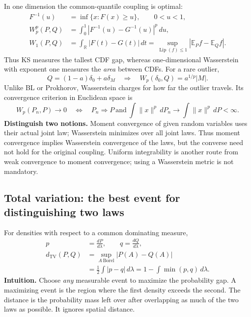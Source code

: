 \documentclass[12pt]{article}
\newcommand{\E}{\mathbb E}
\newcommand{\R}{\mathbb R}
\DeclareMathOperator{\Lip}{Lip}
\begin{document}
In one dimension the common-quantile coupling is optimal:
\begin{align}
 F^{-1}(u)&=\inf\{x:F(x)\ge u\},\qquad 0<u<1,\\
 W_p^p(P,Q)&=\int_0^1|F^{-1}(u)-G^{-1}(u)|^p\,du,\\
 W_1(P,Q)&=\int_{\R}|F(t)-G(t)|\,dt
 =\sup_{\Lip(f)\le1}|\E_Pf-\E_Qf|.
\end{align}
Thus KS measures the tallest CDF gap, whereas one-dimensional Wasserstein
with exponent one measures the \emph{area} between CDFs. For a rare outlier,
\begin{equation}
 Q=(1-a)\delta_0+a\delta_M
 \quad\Longrightarrow\quad W_p(\delta_0,Q)=a^{1/p}|M|.
\end{equation}
Unlike BL or Prokhorov, Wasserstein charges for how far the outlier travels.
Its convergence criterion in Euclidean space is
\begin{equation}
 W_p(P_n,P)\to0\quad\Longleftrightarrow\quad
 P_n\Rightarrow P\ \text{and}\
 \int\|x\|^p\,dP_n\to\int\|x\|^p\,dP<\infty.
\end{equation}
\textbf{Distinguish two notions.} Moment convergence of given random variables
uses their actual joint law; Wasserstein minimizes over all joint laws.
Thus moment convergence implies Wasserstein convergence of the laws, but
the converse need not hold for the original coupling.
Uniform integrability is another route from weak convergence to moment
convergence; using a Wasserstein metric is not mandatory.

\clearpage
\subsection{Total variation: the best event for distinguishing two laws}
For densities with respect to a common dominating measure,
\begin{align}
 p&=\frac{dP}{d\lambda},\qquad q=\frac{dQ}{d\lambda},\\
 d_{\mathrm{TV}}(P,Q)&=\sup_{A\ \mathrm{Borel}}|P(A)-Q(A)|\\
 &=\frac12\int|p-q|\,d\lambda
 =1-\int\min(p,q)\,d\lambda.
\end{align}
\textbf{Intuition.} Choose \emph{any} measurable event to maximize the
probability gap. A maximizing event is the region where the first density
exceeds the second. The distance is the probability mass left over after
overlapping as much of the two laws as possible. It ignores spatial distance.
\end{document}
